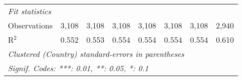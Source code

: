 \begin{tabular}{lccccccc}
   \midrule \emph{Fit statistics}\\
   Observations                                                           & 3,108         & 3,108         & 3,108         & 3,108         & 3,108         & 3,108         & 2,940\\  
   R$^2$                                                                  & 0.552         & 0.553         & 0.554         & 0.554         & 0.554         & 0.554         & 0.610\\  
   \midrule
   \multicolumn{8}{l}{\emph{Clustered (Country) standard-errors in parentheses}}\\
   \multicolumn{8}{l}{\emph{Signif. Codes: ***: 0.01, **: 0.05, *: 0.1}}\\
\end{tabular}
\par\endgroup


